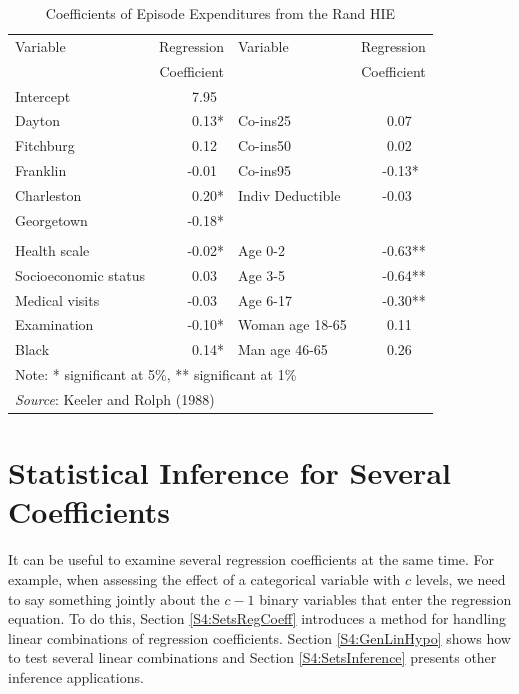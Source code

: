 \begin{table}[h]
\caption{\label{T4:RandHIECoefficients} Coefficients of Episode
Expenditures from the Rand HIE}
\begin{tabular}{lr|lr}
   \hline
  Variable & Regression &   Variable & Regression \\
           & Coefficient &           & Coefficient \\
\hline
    Intercept &       7.95~ &            &            \\
    Dayton &       0.13* &    Co-ins25 &       0.07~~ \\
 Fitchburg &       0.12~ &    Co-ins50 &       0.02~~ \\
  Franklin &      -0.01~ &    Co-ins95 &      -0.13*~ \\
Charleston &       0.20* &    Indiv Deductible &      -0.03~~ \\
Georgetown &      -0.18* &            &            \\
           &            &            &            \\
Health scale &     -0.02* &    Age 0-2 &      -0.63** \\
Socioeconomic status &  0.03~ &    Age 3-5 &      -0.64** \\
Medical visits &      -0.03~ &   Age 6-17 &      -0.30** \\
Examination &      -0.10* & Woman age 18-65 &       0.11~~ \\
     Black &       0.14* & Man age 46-65 &       0.26~~ \\
 \hline
\multicolumn{4}{l}{Note: * significant at 5\%, ** significant at 1\%} \\
     \multicolumn{4}{l}{\textit{Source}: Keeler and Rolph (1988)} \\
      \hline
\end{tabular}
\end{table}

\linejed

\section{Statistical Inference for Several
Coefficients}\label{S4:SeveralCoeff}

It can be useful to examine several regression coefficients at the
same time. For example, when assessing the effect of a categorical
variable with $c$ levels, we need to say something jointly about the
$c-1$ binary variables that enter the regression equation. To do
this, Section \ref{S4:SetsRegCoeff} introduces a method for handling
linear combinations of regression coefficients. Section
\ref{S4:GenLinHypo} shows how to test several linear combinations
and Section \ref{S4:SetsInference} presents other inference
applications.



